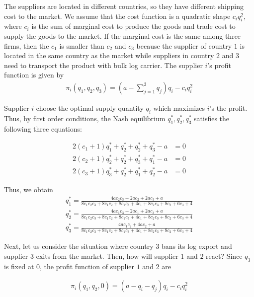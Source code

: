 \documentclass[a4paper,12pt]{article}
\begin{document}
The suppliers are located in different countries, so they have different shipping cost to the market. We assume that the cost function is a quadratic shape $c_{i} q_i ^ 2$, where $c_i$ is the sum of marginal cost to produce the goods and trade cost to supply the goods to the market. If the marginal cost is the same among three firms, then the $c_1$ is smaller than $c_2$ and $c_3$ because the supplier of country $1$ is located in the same country as the market while suppliers in country $2$ and $3$ need to transport the product with bulk log carrier. The supplier $i$'s profit function is given by 
\begin{align}
    \pi_i (q_1, q_2, q_3) = (a - \sum_{j=1}^3 q_{j}) q_{i} - c_{i} q_i ^ 2 
\end{align}

Supplier $i$ choose the optimal supply quantity $q_i$ which maximizes $i$'s the profit. Thus, by first order conditions, the Nash equilibrium $q_1^*, q_2^*, q_3^*$ satisfies the following three equations:

\begin{align}
    2(c_1 + 1) q_1^* + q_2 ^* + q_2 ^ * + q_3 ^ * - a &= 0 \\
    2(c_2 + 1) q_2^* + q_2 ^* + q_3 ^ * + q_1 ^ * - a &= 0 \\
    2(c_3 + 1) q_3^* + q_2 ^* + q_1 ^ * + q_2 ^ * - a &= 0
\end{align}

Thus, we obtain 
\begin{align}
    q_1^* = \frac{4 a c_{2} c_{3} + 2 a c_{2} + 2 a c_{3} + a}{8 c_{1} c_{2} c_{3} + 8 c_{1} c_{2} + 8 c_{1} c_{3} + 4 c_{1} + 8 c_{2} c_{3} + 8 c_{2} + 6 c_{3} + 4} \\
    q_2^* = \frac{4 a c_{1} c_{3} + 2 a c_{1} + 2 a c_{3} + a}{8 c_{1} c_{2} c_{3} + 8 c_{1} c_{2} + 8 c_{1} c_{3} + 4 c_{1} + 8 c_{2} c_{3} + 8 c_{2} + 6 c_{3} + 4} \\
    q_3^* = \frac{4 a c_{1} c_{2} + 4 a c_{2} + a}{8 c_{1} c_{2} c_{3} + 8 c_{1} c_{2} + 8 c_{1} c_{3} + 4 c_{1} + 8 c_{2} c_{3} + 8 c_{2} + 6 c_{3} + 4}
\end{align}

Next, let us consider the situation where country $3$ bans its log export and supplier $3$ exits from the market. Then, how will supplier $1$ and $2$ react? Since $q_3$ is fixed at $0$, the profit function of supplier $1$ and $2$ are 

\begin{align}
    \pi_i (q_1, q_2, 0) = (a - q_i - q_j) q_{i} - c_{i} q_i ^ 2 
\end{align}
\end{document}
